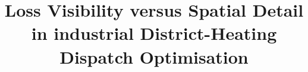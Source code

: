 \documentclass[a4paper,fleqn]{cas-sc} %
\providecommand{\DIFdel}[1]{{\protect\color{red}\sout{#1}}} %
\providecommand{\DIFaddbegin}{} %
\providecommand{\DIFaddend}{} %
\providecommand{\DIFdelbegin}{} %
\providecommand{\DIFdelend}{} %
\providecommand{\textpagefraction}[1]{}
\providecommand{\floatpagepagefraction}[1]{}
\providecommand{\WriteBookmarks}{}
\begin{document}
\DIFdelbegin %
\DIFdel{\textpagefraction{.001}
}%



\DIFdelend 

\DIFdelbegin %


\DIFdelend \DIFaddbegin \title[mode=title]{%
  Loss Visibility versus Spatial Detail in industrial District-Heating Dispatch Optimisation}
\DIFaddend 
\end{document}
